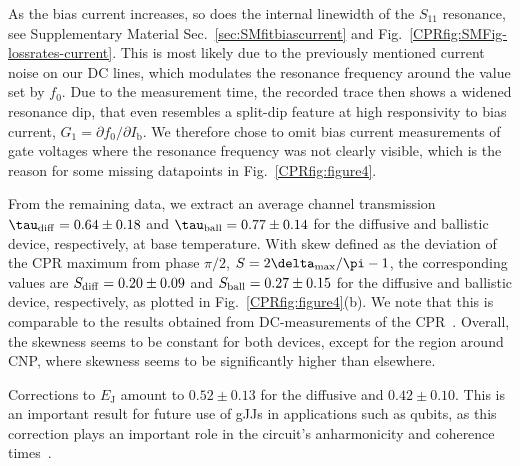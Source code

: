 As the bias current increases, so does the internal linewidth of the $S_{11}$ resonance, see Supplementary Material Sec.~\ref{sec:SMfitbiascurrent} and Fig.~\ref{CPRfig:SMFig-lossrates-current}.
%
This is most likely due to the previously mentioned current noise on our DC lines, which modulates the resonance frequency around the value set by $f_0$.
%
Due to the measurement time, the recorded trace then shows a widened resonance dip, that even resembles a split-dip feature at high responsivity to bias current, $G_1=\partial f_0/\partial I_\text{b}$.
%
We therefore chose to omit bias current measurements of gate voltages where the resonance frequency was not clearly visible, which is the reason for some missing datapoints in Fig.~\ref{CPRfig:figure4}.

From the remaining data, we extract an average channel transmission $\tau_{\rm diff}=0.64\pm0.18$ and $\tau_{\rm ball}=0.77\pm0.14$ for the diffusive and ballistic device, respectively, at base temperature.
%
With skew defined as the deviation of the CPR maximum from phase $\pi/2$, $S=2\delta_{\rm max}/\pi -1$, the corresponding values are $S_{\rm diff}=0.20\pm0.09$ and $S_{\rm ball}=0.27\pm0.15$ for the diffusive and ballistic device, respectively, as plotted in Fig.~\ref{CPRfig:figure4}(b).
%
We note that this is comparable to the results obtained from DC-measurements of the CPR~\cite{englishObservationNonsinusoidalCurrentphase2016,nandaCurrentPhaseRelationBallistic2017}.
%
Overall, the skewness seems to be constant for both devices, except for the region around CNP, where skewness seems to be significantly higher than elsewhere.





Corrections to $E_\text{J}$ amount to $0.52\pm0.13$ for the diffusive and $0.42\pm0.10$.
%
This is an important result for future use of gJJs in applications such as qubits, as this correction plays an important role in the circuit's anharmonicity and coherence times~\cite{kringhojAnharmonicitySuperconductingQubit2018}.

